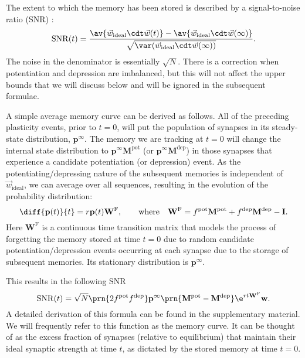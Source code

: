 \documentclass{article} %
\DeclareMathOperator{\snr}{SNR}
\newcommand{\wv}{\vec{w}}
\newcommand{\wvi}{\vec{w}_\text{ideal}}
\newcommand{\I}{\mathbf{I}}
\newcommand{\pr}{\mathbf{p}}
\newcommand{\eq}{\pr^\infty}
\newcommand{\w}{\mathbf{w}}
\newcommand{\W}{\mathbf{W}}
\newcommand{\M}{\mathbf{M}}
\newcommand{\frg}{\W^{\mathrm{F}}}
\newcommand{\pot}{^{\text{pot}}}
\newcommand{\dep}{^{\text{dep}}}
\begin{document}
The extent to which the memory has been stored is described by a signal-to-noise ratio (SNR) \cite{Fusi2005cascade,Fusi2007multistate}:
%
\begin{equation}\label{eq:SNRdef}
  \snr(t) = \frac{\av{\wv_\text{ideal}\cdt\wv(t)} - \av{\wv_\text{ideal}\cdt\wv(\infty)}}
     {\sqrt{\var(\wv_\text{ideal}\cdt\wv(\infty))}}.
\end{equation}
%
The noise in the denominator is essentially $\sqrt{N}$.
There is a correction when potentiation and depression are imbalanced, but this will not affect the upper bounds that we will discuss below and will be ignored in the subsequent formulae.

A simple average memory curve can be derived as follows.
All of the preceding plasticity events, prior to $t=0$, will put the population of synapses in its steady-state distribution, $\eq$.
The memory we are tracking at $t=0$ will change the internal state distribution to $\eq\M\pot$ (or $\eq\M\dep$) in those synapses that experience a candidate potentiation (or depression) event.
As the potentiating/depressing nature of the subsequent memories is independent of $\wvi$, we can average over all sequences, resulting in the evolution of the probability distribution:
%
\begin{equation}\label{eq:evol}
  \diff{\pr(t)}{t} = r\pr(t)\frg,
  \qquad \text{where} \quad
  \frg = f\pot\M\pot + f\dep\M\dep - \I.
\end{equation}
%
Here $\frg$ is a continuous time transition matrix that models the process of forgetting the memory stored at time $t=0$ due to random candidate potentiation/depression events occurring at each synapse due to the storage of subsequent memories.
Its stationary distribution is $\eq$.


This results in the following SNR
%
\begin{equation}\label{eq:SNRcalc}
  \snr(t) = \sqrt{N}\prn{2 f\pot f\dep} \eq \prn{\M\pot-\M\dep} \e^{rt\frg} \w.
\end{equation}
%
A detailed derivation of this formula can be found in the supplementary material.
We will frequently refer to this function as the memory curve.
It can be thought of as the excess fraction of synapses (relative to equilibrium) that maintain their ideal synaptic strength at time $t$, as dictated by the stored memory at time $t=0$.
\end{document}
